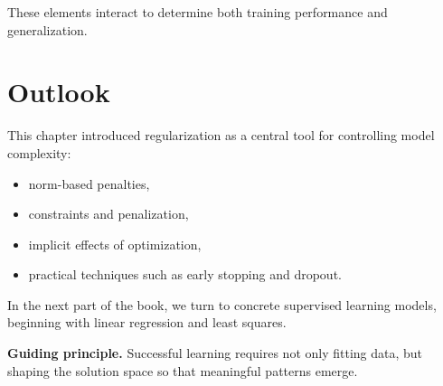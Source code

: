 \medskip

\noindent
These elements interact to determine both training performance and generalization.

\section{Outlook}

This chapter introduced regularization as a central tool for controlling model complexity:
\begin{itemize}
    \item norm-based penalties,
    \item constraints and penalization,
    \item implicit effects of optimization,
    \item practical techniques such as early stopping and dropout.
\end{itemize}

\medskip

In the next part of the book, we turn to concrete supervised learning models, beginning with linear regression and least squares.

\medskip

\noindent
\textbf{Guiding principle.}  
Successful learning requires not only fitting data, but shaping the solution space so that meaningful patterns emerge.